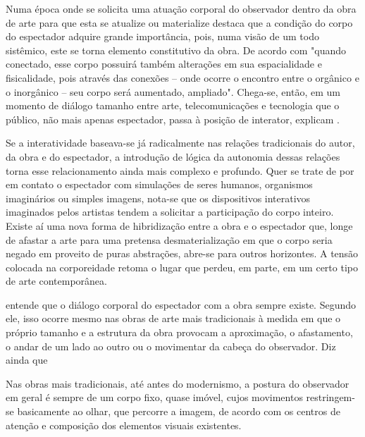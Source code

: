 Numa época onde se solicita uma atuação corporal do observador dentro da obra de arte para que esta se atualize ou materialize  destaca que a condição do corpo do espectador adquire grande importância, pois, numa visão de um todo sistêmico, este se torna elemento constitutivo da obra. De acordo com  "quando conectado, esse corpo possuirá também alterações em sua espacialidade e fisicalidade, pois através das conexões – onde ocorre o encontro entre o orgânico e o inorgânico – seu corpo será aumentado, ampliado". Chega-se, então, em um momento de diálogo tamanho entre arte, telecomunicações e tecnologia que o público, não mais apenas espectador, passa à posição de interator, explicam . 

\begin{citacao}
Se a interatividade baseava-se já radicalmente nas relações tradicionais do autor, da obra e do espectador, a introdução de lógica da autonomia dessas relações torna esse relacionamento ainda mais complexo e profundo. Quer se trate de por em contato o espectador com simulações de seres humanos, organismos imaginários ou simples imagens, nota-se que os dispositivos interativos imaginados pelos artistas tendem a solicitar a participação do corpo inteiro. Existe aí uma nova forma de hibridização entre a obra e o espectador que, longe de afastar a arte para uma pretensa desmaterialização em que o corpo seria negado em proveito de puras abstrações, abre-se para outros horizontes. A tensão colocada na corporeidade retoma o lugar que perdeu, em parte, em um certo tipo de arte contemporânea. \cite[p. 37]{couchot}  
\end{citacao}

	
 entende que o diálogo corporal do espectador com a obra sempre existe. Segundo ele, isso ocorre mesmo nas obras de arte mais tradicionais à medida em que o próprio tamanho e a estrutura da obra provocam a aproximação, o afastamento, o andar de um lado ao outro ou o movimentar da cabeça do observador. Diz ainda que

\begin{citacao}
Nas obras mais tradicionais, até antes do modernismo, a postura do observador em geral é sempre de um corpo fixo, quase imóvel, cujos movimentos restringem-se basicamente ao olhar, que percorre a imagem, de acordo com os centros de atenção e composição dos elementos visuais existentes. \cite{sogabe} 
\end{citacao}

